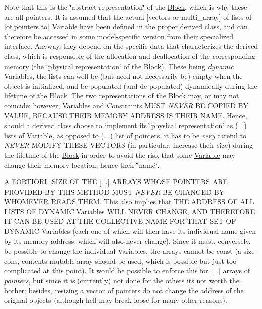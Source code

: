 Note that this is the \char`\"{}abstract representation\char`\"{} of the \mbox{\hyperlink{class_s_m_spp__di__unipi__it_1_1_block}{Block}}, which is why these are all pointers. It is assumed that the actual \mbox{[}vectors or multi\+\_\+array\mbox{]} of lists of \mbox{[}of pointers to\mbox{]} \mbox{\hyperlink{class_s_m_spp__di__unipi__it_1_1_variable}{Variable}} have been defined in the proper derived class, and can therefore be accessed in some model-\/specific version from their specialized interface. Anyway, they depend on the specific data that characterizes the derived class, which is responsible of the allocation and deallocation of the corresponding memory (the \char`\"{}physical representation\char`\"{} of the \mbox{\hyperlink{class_s_m_spp__di__unipi__it_1_1_block}{Block}}). These being {\itshape dynamic} Variables, the lists can well be (but need not necessarily be) empty when the object is initialized, and be populated (and de-\/populated) dynamically during the lifetime of the \mbox{\hyperlink{class_s_m_spp__di__unipi__it_1_1_block}{Block}}. The two representations of the \mbox{\hyperlink{class_s_m_spp__di__unipi__it_1_1_block}{Block}} may, or may not, coincide\+: however, Variables and Constraints M\+U\+ST {\itshape N\+E\+V\+ER} BE C\+O\+P\+I\+ED BY V\+A\+L\+UE, B\+E\+C\+A\+U\+SE T\+H\+E\+IR M\+E\+M\+O\+RY A\+D\+D\+R\+E\+SS IS T\+H\+E\+IR N\+A\+ME. Hence, should a derived class choose to implement its \char`\"{}physical representation\char`\"{} as (...) lists of \mbox{\hyperlink{class_s_m_spp__di__unipi__it_1_1_variable}{Variable}}, as opposed to (...) list of pointers, it has to be {\itshape very} careful to {\itshape N\+E\+V\+ER} M\+O\+D\+I\+FY T\+H\+E\+SE V\+E\+C\+T\+O\+RS (in particular, increase their size) during the lifetime of the \mbox{\hyperlink{class_s_m_spp__di__unipi__it_1_1_block}{Block}} in order to avoid the risk that some \mbox{\hyperlink{class_s_m_spp__di__unipi__it_1_1_variable}{Variable}} may change their memory location, hence their \char`\"{}name\char`\"{}.

A F\+O\+R\+T\+I\+O\+RI, S\+I\+ZE OF T\+HE \mbox{[}...\mbox{]} A\+R\+R\+A\+YS W\+H\+O\+SE P\+O\+I\+N\+T\+E\+RS A\+RE P\+R\+O\+V\+I\+D\+ED BY T\+H\+IS M\+E\+T\+H\+OD M\+U\+ST {\itshape N\+E\+V\+ER} BE C\+H\+A\+N\+G\+ED BY W\+H\+O\+M\+E\+V\+ER R\+E\+A\+DS T\+H\+EM. This also implies that T\+HE A\+D\+D\+R\+E\+SS OF A\+LL L\+I\+S\+TS OF D\+Y\+N\+A\+M\+IC Variables W\+I\+LL N\+E\+V\+ER C\+H\+A\+N\+GE, A\+ND T\+H\+E\+R\+E\+F\+O\+RE IT C\+AN BE U\+S\+ED AT T\+HE C\+O\+L\+L\+E\+C\+T\+I\+VE N\+A\+ME F\+OR T\+H\+AT S\+ET OF D\+Y\+N\+A\+M\+IC Variables (each one of which will then have its individual name given by its memory address, which will also never change). Since it must, conversely, be possible to change the individual Variables, the arrays cannot be const (a size-\/cons, contents-\/mutable array should be used, which is possible but just too complicated at this point). It would be possible to enforce this for \mbox{[}...\mbox{]} arrays of {\itshape pointers}, but since it is (currently) not done for the others it\textquotesingle{}s not worth the bother; besides, resizing a vector of pointers do not change the address of the original objects (although hell may break loose for many other reasons).


